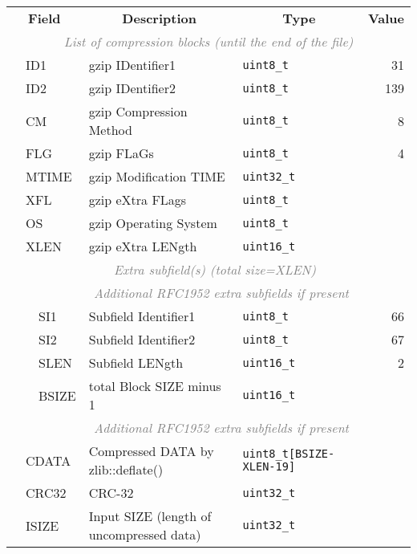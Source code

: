 \documentclass[10pt]{article}
\begin{document}
\begin{table}[ht]
\centering
{\small
\begin{tabular}{|l|l|l|l|l|r|}
  \cline{1-6}
  \multicolumn{3}{|c|}{\bf Field} & \multicolumn{1}{c|}{\bf Description} & \multicolumn{1}{c|}{\bf Type} & \multicolumn{1}{c|}{\bf Value} \\\cline{1-6}
  \multicolumn{6}{|c|}{\textcolor{gray}{\it List of compression blocks (until the end of the file)}} \\\cline{2-6}
  & \multicolumn{2}{l|}{\sf ID1} & gzip IDentifier1 & {\tt uint8\_t} & 31 \\\cline{2-6}
  & \multicolumn{2}{l|}{\sf ID2} & gzip IDentifier2 & {\tt uint8\_t} & 139 \\\cline{2-6}
  & \multicolumn{2}{l|}{\sf CM} & gzip Compression Method & {\tt uint8\_t} & 8 \\\cline{2-6}
  & \multicolumn{2}{l|}{\sf FLG} & gzip FLaGs & {\tt uint8\_t} & 4 \\\cline{2-6}
  & \multicolumn{2}{l|}{\sf MTIME} & gzip Modification TIME & {\tt uint32\_t} & \\\cline{2-6}
  & \multicolumn{2}{l|}{\sf XFL} & gzip eXtra FLags & {\tt uint8\_t} & \\\cline{2-6}
  & \multicolumn{2}{l|}{\sf OS} & gzip Operating System & {\tt uint8\_t} & \\\cline{2-6}
  & \multicolumn{2}{l|}{\sf XLEN} & gzip eXtra LENgth & {\tt uint16\_t} & \\\cline{2-6}
  & \multicolumn{5}{c|}{\textcolor{gray}{\it Extra subfield(s) (total size=XLEN)}} \\\cline{3-6}
  & & \multicolumn{4}{c|}{\textcolor{gray}{\it Additional RFC1952 extra subfields if present}} \\\cline{3-6}
  & & {\sf SI1} & Subfield Identifier1 & {\tt uint8\_t} & 66 \\\cline{3-6}
  & & {\sf SI2} & Subfield Identifier2 & {\tt uint8\_t} & 67 \\\cline{3-6}
  & & {\sf SLEN} & Subfield LENgth & {\tt uint16\_t} & 2 \\\cline{3-6}
  & & {\sf BSIZE} & total Block SIZE minus 1 & {\tt uint16\_t} & \\\cline{3-6}
  & & \multicolumn{4}{c|}{\textcolor{gray}{\it Additional RFC1952 extra subfields if present}} \\\cline{2-6}
  & \multicolumn{2}{l|}{\sf CDATA} & Compressed DATA by {\sf zlib::deflate()} & {\tt uint8\_t[{\sf BSIZE-XLEN-19}]} & \\\cline{2-6}
  & \multicolumn{2}{l|}{\sf CRC32} & CRC-32 & {\tt uint32\_t} & \\\cline{2-6}
  & \multicolumn{2}{l|}{\sf ISIZE} & Input SIZE (length of uncompressed data) & {\tt uint32\_t} & \\
  \cline{1-6}
\end{tabular}}
\end{table}
\end{document}
